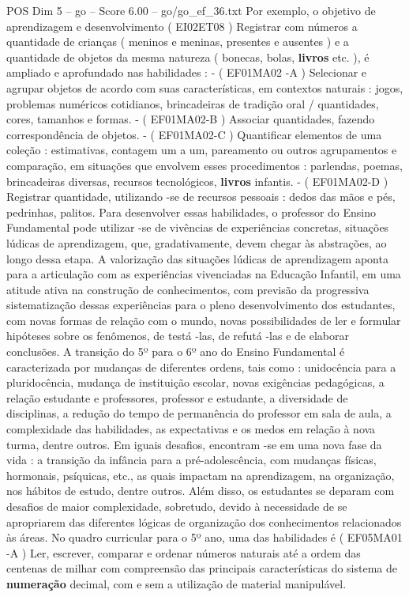 \begin{textsample}{POS Dim 5 – go – Score 6.00 – go/go\_ef\_36.txt}
Por exemplo, o objetivo de aprendizagem e desenvolvimento ( EI02ET08 ) Registrar com números a quantidade de crianças ( meninos e meninas, presentes e ausentes ) e a quantidade de objetos da mesma natureza ( bonecas, bolas, \textbf{livros} etc. ), é ampliado e aprofundado nas habilidades : - ( EF01MA02 -A ) Selecionar e agrupar objetos de acordo com suas características, em contextos naturais : jogos, problemas numéricos cotidianos, brincadeiras de tradição oral / quantidades, cores, tamanhos e formas. - ( EF01MA02-B ) Associar quantidades, fazendo correspondência de objetos. - ( EF01MA02-C ) Quantificar elementos de uma coleção : estimativas, contagem um a um, pareamento ou outros agrupamentos e comparação, em situações que envolvem esses procedimentos : parlendas, poemas, brincadeiras diversas, recursos tecnológicos, \textbf{livros} infantis. - ( EF01MA02-D ) Registrar quantidade, utilizando -se de recursos pessoais : dedos das mãos e pés, pedrinhas, palitos.
Para desenvolver essas habilidades, o professor do Ensino Fundamental pode utilizar -se de vivências de experiências concretas, situações lúdicas de aprendizagem, que, gradativamente, devem chegar às abstrações, ao longo dessa etapa.
A valorização das situações lúdicas de aprendizagem aponta para a articulação com as experiências vivenciadas na Educação Infantil, em uma atitude ativa na construção de conhecimentos, com previsão da progressiva sistematização dessas experiências para o pleno desenvolvimento dos estudantes, com novas formas de relação com o mundo, novas possibilidades de ler e formular hipóteses sobre os fenômenos, de testá -las, de refutá -las e de elaborar conclusões.
A transição do 5º para o 6º ano do Ensino Fundamental é caracterizada por mudanças de diferentes ordens, tais como : unidocência para a pluridocência, mudança de instituição escolar, novas exigências pedagógicas, a relação estudante e professores, professor e estudante, a diversidade de disciplinas, a redução do tempo de permanência do professor em sala de aula, a complexidade das habilidades, as expectativas e os medos em relação à nova turma, dentre outros.
Em iguais desafios, encontram -se em uma nova fase da vida : a transição da infância para a pré-adolescência, com mudanças físicas, hormonais, psíquicas, etc., as quais impactam na aprendizagem, na organização, nos hábitos de estudo, dentre outros.
Além disso, os estudantes se deparam com desafios de maior complexidade, sobretudo, devido à necessidade de se apropriarem das diferentes lógicas de organização dos conhecimentos relacionados às áreas.
No quadro curricular para o 5º ano, uma das habilidades é ( EF05MA01 -A ) Ler, escrever, comparar e ordenar números naturais até a ordem das centenas de milhar com compreensão das principais características do sistema de \textbf{numeração} decimal, com e sem a utilização de material manipulável.

\end{textsample}

